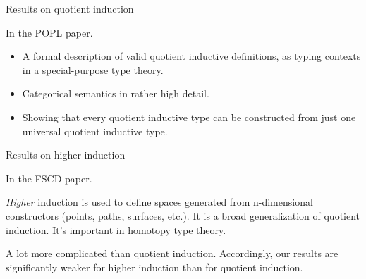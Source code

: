 \documentclass[dvipsnames]{beamer}
\begin{document}
\begin{frame}{Results on quotient induction}

In the POPL paper.
\vspace{1em}

\begin{itemize}
\item A formal description of valid quotient inductive definitions,
      as typing contexts in a special-purpose type theory.
\item Categorical semantics in rather high detail.
\item Showing that every quotient inductive type can be constructed from just one universal quotient
      inductive type.
\end{itemize}

\end{frame}

\begin{frame}{Results on higher induction}

In the FSCD paper.
\vspace{1em}

\emph{Higher} induction is used to define spaces generated from n-dimensional
constructors (points, paths, surfaces, etc.).  It is a broad generalization of
quotient induction. It's important in homotopy type theory.
\vspace{1em}

A lot more complicated than quotient induction. Accordingly, our results are
significantly weaker for higher induction than for quotient induction.

\end{frame}
\end{document}
